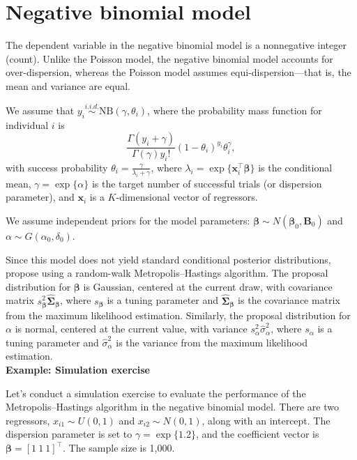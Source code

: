 \section{Negative binomial model}\label{sec67}

The dependent variable in the negative binomial model is a nonnegative integer (count). Unlike the Poisson model, the negative binomial model accounts for over-dispersion, whereas the Poisson model assumes equi-dispersion—that is, the mean and variance are equal.

We assume that $y_i \stackrel{i.i.d.}{\sim} \text{NB}(\gamma, \theta_i)$, where the probability mass function for individual $i$ is 
\[
\frac{\Gamma(y_i + \gamma)}{\Gamma(\gamma) y_i!} (1 - \theta_i)^{y_i} \theta_i^{\gamma},
\]
with success probability $\theta_i = \frac{\gamma}{\lambda_i + \gamma}$, where $\lambda_i = \exp\{\bm{x}_i^{\top}\bm{\beta}\}$ is the conditional mean, $\gamma = \exp\{\alpha\}$ is the target number of successful trials (or dispersion parameter), and $\bm{x}_i$ is a $K$-dimensional vector of regressors.

We assume independent priors for the model parameters: $\bm{\beta} \sim N(\bm{\beta}_0, \bm{B}_0)$ and $\alpha \sim G(\alpha_0, \delta_0)$.

Since this model does not yield standard conditional posterior distributions, \cite{rossi2012bayesian} propose using a random-walk Metropolis–Hastings algorithm. The proposal distribution for $\bm{\beta}$ is Gaussian, centered at the current draw, with covariance matrix $s_{\bm{\beta}}^2 \hat{\bm{\Sigma}}_{\bm{\beta}}$, where $s_{\bm{\beta}}$ is a tuning parameter and $\hat{\bm{\Sigma}}_{\bm{\beta}}$ is the covariance matrix from the maximum likelihood estimation. Similarly, the proposal distribution for $\alpha$ is normal, centered at the current value, with variance $s_{\alpha}^2 \hat{\sigma}_{\alpha}^2$, where $s_{\alpha}$ is a tuning parameter and $\hat{\sigma}_{\alpha}^2$ is the variance from the maximum likelihood estimation.\\

\textbf{Example: Simulation exercise}

Let's conduct a simulation exercise to evaluate the performance of the Metropolis–Hastings algorithm in the negative binomial model. There are two regressors, $x_{i1} \sim U(0,1)$ and $x_{i2} \sim N(0,1)$, along with an intercept. The dispersion parameter is set to $\gamma = \exp\{1.2\}$, and the coefficient vector is $\bm{\beta} = [1 \ 1 \ 1]^{\top}$. The sample size is 1,000.

